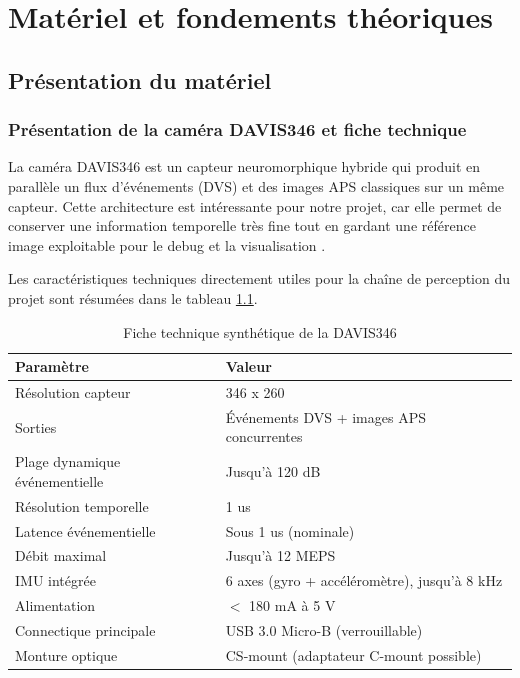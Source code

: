 \chapter{Matériel et fondements théoriques}

\section{Présentation du matériel}

\subsection{Présentation de la caméra DAVIS346 et fiche technique}
La caméra DAVIS346 est un capteur neuromorphique hybride qui produit en
parallèle un flux d'événements (DVS) et des images APS classiques sur un même
capteur. Cette architecture est intéressante pour notre projet, car elle permet
de conserver une information temporelle très fine tout en gardant une référence
image exploitable pour le debug et la visualisation \cite{davis346_datasheet}.

Les caractéristiques techniques directement utiles pour la chaîne de perception
du projet sont résumées dans le tableau \ref{tab:davis_specs}.

\begin{table}[H]
\centering
\caption{Fiche technique synthétique de la DAVIS346}
\label{tab:davis_specs}
\begin{tabular}{ll}
\toprule
Paramètre & Valeur \\
\midrule
Résolution capteur & 346 x 260 \\
Sorties & Événements DVS + images APS concurrentes \\
Plage dynamique événementielle & Jusqu'à 120 dB \\
Résolution temporelle & 1 us \\
Latence événementielle & Sous 1 us (nominale) \\
Débit maximal & Jusqu'à 12 MEPS \\
IMU intégrée & 6 axes (gyro + accéléromètre), jusqu'à 8 kHz \\
Alimentation & $<$ 180 mA à 5 V \\
Connectique principale & USB 3.0 Micro-B (verrouillable) \\
Monture optique & CS-mount (adaptateur C-mount possible) \\
\bottomrule
\end{tabular}
\end{table}

